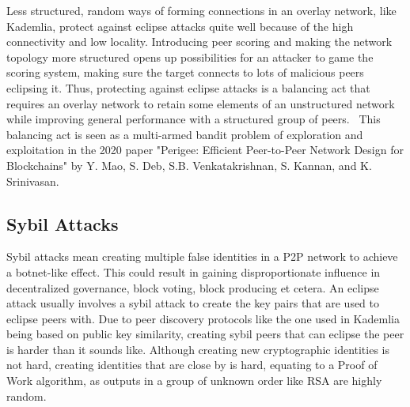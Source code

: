 Less structured, random ways of forming connections in an overlay network, like Kademlia, protect against eclipse attacks quite well because of the high connectivity and low locality. Introducing peer scoring and making the network topology more structured opens up possibilities for an attacker to game the scoring system, making sure the target connects to lots of malicious peers eclipsing it. Thus, protecting against eclipse attacks is a balancing act that requires an overlay network to retain some elements of an unstructured network while improving general performance with a structured group of peers.~\cite{Mao2020-ee} This balancing act is seen as a multi-armed bandit problem of exploration and exploitation in the 2020 paper "Perigee: Efficient Peer-to-Peer Network Design for Blockchains" by Y. Mao, S. Deb, S.B. Venkatakrishnan, S. Kannan, and K. Srinivasan.

\subsection{Sybil Attacks}
Sybil attacks mean creating multiple false identities in a P2P network to achieve a botnet-like effect. This could result in gaining disproportionate influence in decentralized governance, block voting, block producing et cetera. An eclipse attack usually involves a sybil attack to create the key pairs that are used to eclipse peers with. Due to peer discovery protocols like the one used in Kademlia being based on public key similarity, creating sybil peers that can eclipse the peer is harder than it sounds like. Although creating new cryptographic identities is not hard, creating identities that are close by is hard, equating to a Proof of Work algorithm, as outputs in a group of unknown order like RSA are highly random.
